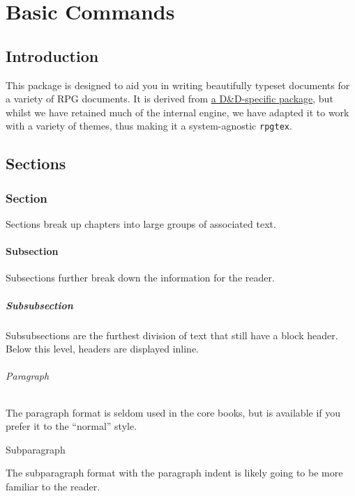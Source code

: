 
\frontmatter
\maketitle
\tableofcontents


\mainmatter

\part{Basic Commands}

	\chapter{Introduction}


	 This package is designed to aid you in writing beautifully typeset documents for a variety of RPG documents. It is derived from \href{https://github.com/rpgtex/DND-5e-LaTeX-Template}{a D\&D-specific package}, but whilst we have retained much of the internal engine, we have adapted it to work with a variety of themes, thus making it a system-agnostic \verb|rpgtex|.

	\chapter{Sections}
		\section{Section}
			Sections break up chapters into large groups of associated text.

			\subsection{Subsection}
				Subsections further break down the information for the reader.

				\subsubsection{Subsubsection}
					Subsubsections are the furthest division of text that still have a block header. Below this level, headers are displayed inline.

					\paragraph{Paragraph}
					The paragraph format is seldom used in the core books, but is available if you prefer it to the ``normal'' style.

					\subparagraph{Subparagraph}
					The subparagraph format with the paragraph indent is likely going to be more familiar to the reader.

